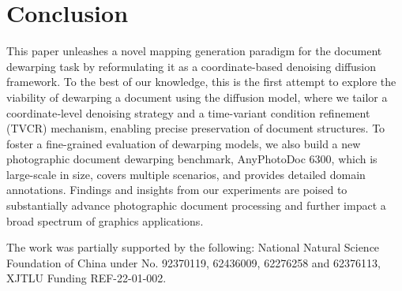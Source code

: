 

\section{Conclusion}
This paper unleashes a novel mapping generation paradigm for the document dewarping task by reformulating it as a coordinate-based denoising diffusion framework.
To the best of our knowledge, this is the first attempt to explore the viability of dewarping a document using the diffusion model, where we tailor a coordinate‑level denoising strategy and a time-variant condition refinement (TVCR) mechanism, enabling precise preservation of document structures.
To foster a fine-grained evaluation of dewarping models, we also build a new photographic document dewarping benchmark, AnyPhotoDoc 6300, which is large-scale in size, covers multiple scenarios, and provides detailed domain annotations.
Findings and insights from our experiments are poised to substantially advance photographic document processing and further impact a broad spectrum of graphics applications.

\begin{acks}
The work was partially supported by the following: National Natural Science Foundation of China under No. 92370119, 62436009, 62276258 and 62376113, XJTLU Funding REF-22-01-002.
\end{acks}

